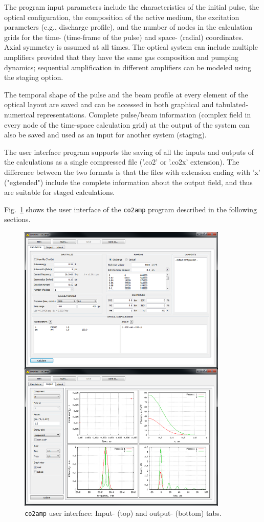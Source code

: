 \documentclass{report}
\begin{document}
The program input parameters include the characteristics of the initial pulse, the optical configuration, the composition of the active medium, the excitation parameters (e.g., discharge profile), and the number of nodes in the calculation grids for the time- (time-frame of the pulse) and space- (radial) coordinates. Axial symmetry is assumed at all times. The optical system can include multiple amplifiers provided that they have the same gas composition and pumping dynamics; sequential amplification in different amplifiers can be modeled using the staging option.

The temporal shape of the pulse and the beam profile at every element of the optical layout are saved and can be accessed in both graphical and tabulated-numerical representations. Complete pulse/beam information (complex field in every node of the time-space calculation grid) at the output of the system can also be saved and used as an input for another system (staging).

The user interface program supports the saving of all the inputs and outputs of the calculations as a single compressed file ('.co2' or '.co2x' extension). The difference between the two formats is that the files with extension ending with 'x' ("e\underline{x}tended") include the complete information about the output field, and thus are suitable for staged calculations.

Fig.~\ref{fig:co2amp} shows the user interface of the \texttt{co2amp} program described in the following sections.

\begin{figure}[ht]
\centering
\includegraphics[width=10cm]{images/co2amp}
\caption{\texttt{co2amp} user interface: Input- (top) and output- (bottom) tabs.}\label{fig:co2amp}
\end{figure}
\end{document}
